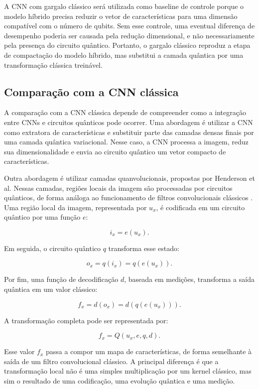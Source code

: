 \documentclass[
    12pt,
    openright,
    oneside,
    a4paper,
    english,
    brazil
]{abntex2}
\begin{document}
A CNN com gargalo clássico será utilizada como baseline de controle porque o modelo híbrido precisa reduzir o vetor de características para uma dimensão compatível com o número de qubits. Sem esse controle, uma eventual diferença de desempenho poderia ser causada pela redução dimensional, e não necessariamente pela presença do circuito quântico. Portanto, o gargalo clássico reproduz a etapa de compactação do modelo híbrido, mas substitui a camada quântica por uma transformação clássica treinável.

\subsection{Comparação com a CNN clássica}
\label{subsec:comparacao_cnn_classica}

A comparação com a CNN clássica depende de compreender como a integração entre CNNs e circuitos quânticos pode ocorrer. Uma abordagem é utilizar a CNN como extratora de características e substituir parte das camadas densas finais por uma camada quântica variacional. Nesse caso, a CNN processa a imagem, reduz sua dimensionalidade e envia ao circuito quântico um vetor compacto de características.

Outra abordagem é utilizar camadas quanvolucionais, propostas por Henderson et al. Nessas camadas, regiões locais da imagem são processadas por circuitos quânticos, de forma análoga ao funcionamento de filtros convolucionais clássicos \cite{henderson2020quanvolutional}. Uma região local da imagem, representada por \(u_x\), é codificada em um circuito quântico por uma função \(e\):

\[
i_x = e(u_x).
\]

Em seguida, o circuito quântico \(q\) transforma esse estado:

\[
o_x = q(i_x) = q(e(u_x)).
\]

Por fim, uma função de decodificação \(d\), baseada em medições, transforma a saída quântica em um valor clássico:

\[
f_x = d(o_x) = d(q(e(u_x))).
\]

A transformação completa pode ser representada por:

\[
f_x = Q(u_x, e, q, d).
\]

Esse valor \(f_x\) passa a compor um mapa de características, de forma semelhante à saída de um filtro convolucional clássico. A principal diferença é que a transformação local não é uma simples multiplicação por um kernel clássico, mas sim o resultado de uma codificação, uma evolução quântica e uma medição.
\end{document}
